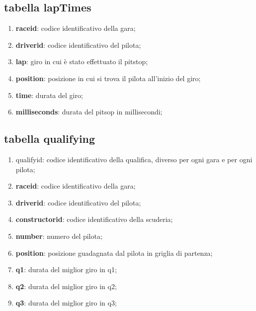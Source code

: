\subsection{tabella lapTimes}%
\begin{enumerate}
    \item \textbf{raceid}: codice identificativo della gara;
    \item \textbf{driverid}: codice identificativo del pilota;
    \item \textbf{lap}: giro in cui è stato effettuato il pitstop;
    \item \textbf{position}: posizione in cui si trova il pilota all'inizio del giro;
    \item \textbf{time}: durata del giro;
    \item \textbf{milliseconds}: durata del pitsop in millisecondi;
\end{enumerate}
\subsection{tabella qualifying}%
\begin{enumerate}
    \item qualifyid: codice identificativo della qualifica, diverso per ogni gara e per ogni pilota;
    \item \textbf{raceid}: codice identificativo della gara;
    \item \textbf{driverid}: codice identificativo del pilota;
    \item \textbf{constructorid}: codice identificativo della scuderia;
    \item \textbf{number}: numero del pilota;
    \item \textbf{position}: posizione guadagnata dal pilota in griglia di partenza;
    \item \textbf{q1}: durata del miglior giro in q1;
    \item \textbf{q2}: durata del miglior giro in q2;
    \item \textbf{q3}: durata del miglior giro in q3;
\end{enumerate}
